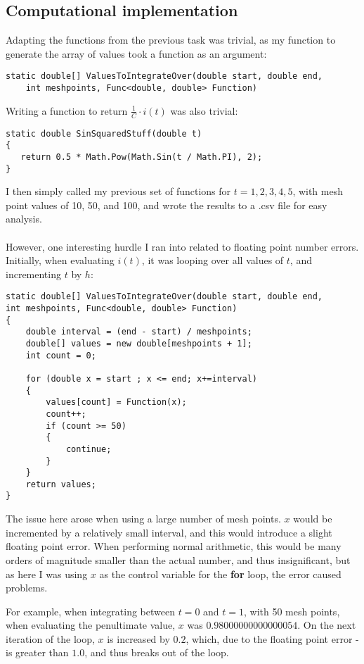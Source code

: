 \documentclass[10pt,fleqn,a4paper]{article} %
\renewcommand{\=}[1]{\stackrel{#1}{=}} %
\theoremstyle{definition}
\theoremstyle{remark}
\begin{document}
\subsection{Computational implementation}
Adapting the functions from the previous task was trivial, as my function to generate the array of values took a function as an argument:
\lstset{style=sharpc}
\begin{lstlisting}
static double[] ValuesToIntegrateOver(double start, double end,
	int meshpoints, Func<double, double> Function)
\end{lstlisting}
Writing a function to return $\frac{1}{C} \cdot i(t)$ was also trivial:
\lstset{style=sharpc}
\begin{lstlisting}
static double SinSquaredStuff(double t)
{
   return 0.5 * Math.Pow(Math.Sin(t / Math.PI), 2);
}
\end{lstlisting}
I then simply called my previous set of functions for $t = { 1 , 2 , 3 , 4, 5}$, with mesh point values of 10, 50, and 100, and wrote the results to a .csv file for easy analysis.\\\\
However, one interesting hurdle I ran into related to floating point number errors. Initially, when evaluating $i(t)$, it was looping over all values of $t$, and incrementing $t$ by $h$:
\lstset{style=sharpc}
\begin{lstlisting}
static double[] ValuesToIntegrateOver(double start, double end,
int meshpoints, Func<double, double> Function)
{      
	double interval = (end - start) / meshpoints;
	double[] values = new double[meshpoints + 1];
	int count = 0;

	for (double x = start ; x <= end; x+=interval)
	{
		values[count] = Function(x);
		count++;
		if (count >= 50)
		{
			continue;
		}
	}
	return values;
}
\end{lstlisting}
The issue here arose when using a large number of mesh points. $x$ would be incremented by a relatively small interval, and this would introduce a slight floating point error. When performing normal arithmetic, this would be many orders of magnitude smaller than the actual number, and thus insignificant, but as here I was using $x$ as the control variable for the {\bf for} loop, the error caused problems.

For example, when integrating between $t=0$ and $t=1$, with 50 mesh points, when evaluating the penultimate value, $x$ was $0.98000000000000054$. On the next iteration of the loop, $x$ is increased by $0.2$, which, due to the floating point error - is greater than $1.0$, and thus breaks out of the loop.
\end{document}
